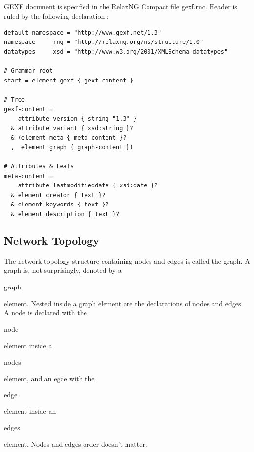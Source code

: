 \documentclass[a4paper,10pt]{article}
\begin{document}
\paragraph{}
GEXF document is specified in the \href{http://relaxng.org/compact-tutorial-20030326.html}{RelaxNG Compact} file \href{http://www.gexf.net/1.3/gexf.rnc}{gexf.rnc}. Header is ruled by the following declaration :

\lstset{ style=rnc }
\begin{lstlisting}[caption={Header Specification},label=headerRNC]
default namespace = "http://www.gexf.net/1.3"
namespace     rng = "http://relaxng.org/ns/structure/1.0"
datatypes     xsd = "http://www.w3.org/2001/XMLSchema-datatypes"

# Grammar root
start = element gexf { gexf-content }

# Tree
gexf-content =
    attribute version { string "1.3" }
  & attribute variant { xsd:string }?
  & (element meta { meta-content }?
  ,  element graph { graph-content })

# Attributes & Leafs
meta-content =
    attribute lastmodifieddate { xsd:date }?
  & element creator { text }?
  & element keywords { text }?
  & element description { text }?
\end{lstlisting}

\subsection{Network Topology} \label{networktopology}

The network topology structure containing nodes and edges is called the graph. A graph is, not surprisingly, denoted by a \begin{footnotesize}graph\end{footnotesize} element. Nested inside a graph element are the declarations of nodes and edges. A node is declared with the \begin{footnotesize}node\end{footnotesize} element inside a \begin{footnotesize}nodes\end{footnotesize} element, and an egde with the \begin{footnotesize}edge\end{footnotesize} element inside an \begin{footnotesize}edges\end{footnotesize} element. Nodes and edges order doesn't matter.
\end{document}

